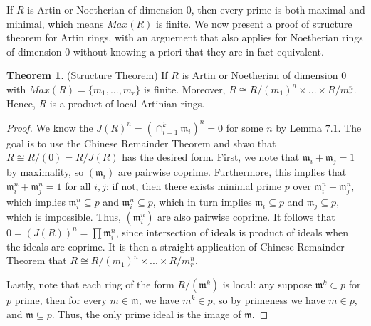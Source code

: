 \documentclass{article}
\theoremstyle{definition}
\newtheorem{theorem}{Theorem}[section]
\theoremstyle{definition}
\theoremstyle{definition}
\theoremstyle{definition}
\theoremstyle{definition}
\theoremstyle{definition}
\theoremstyle{definition}
\begin{document}
If $R$ is Artin or Noetherian of dimension $0$, then every prime is both maximal and minimal, which means $Max(R)$ is finite. We now present a proof of structure theorem for Artin rings, with an arguement that also applies for Noetherian rings of dimension $0$ without knowing a priori that they are in fact equivalent. 
\begin{tcolorbox}[colback=red!5!white,colframe=red!30!white]
\begin{theorem}
    (Structure Theorem) If $R$ is Artin or Noetherian of dimension $0$ with $Max(R)=\{m_1,...,m_r\}$ is finite. Moreover, $R\cong R/(m_1)^n\times...\times R/m_r^n$. Hence, $R$ is a product of local Artinian rings. 
\end{theorem}
\end{tcolorbox}
\begin{proof}
    We know the $J(R)^n=(\cap_{i=1}^k \mathfrak{m}_i)^n=0$ for some $n$ by Lemma $7.1$. The goal is to use the Chinese Remainder Theorem and shwo that $R\cong R/(0)=R/J(R)$ has the desired form. First, we note that $\mathfrak{m}_i+\mathfrak{m}_j=1$ by maximality, so $(\mathfrak{m}_i)$ are pairwise coprime. Furthermore, this implies that $\mathfrak{m}_i^n+\mathfrak{m}^n_j=1$ for all $i,j$: if not, then there exists minimal prime $p$ over $\mathfrak{m}_i^n+\mathfrak{m}_j^n$, which implies $\mathfrak{m}_i^n\subseteq p$ and $\mathfrak{m}_i^n\subseteq p$, which in turn implies $\mathfrak{m}_i\subseteq p$ and $\mathfrak{m}_j\subseteq p$, which is impossible. Thus, $(\mathfrak{m}_i^n)$ are also pairwise coprime. It follows that $0=(J(R))^n=\prod \mathfrak{m}_i^n$, since intersection of ideals is product of ideals when the ideals are coprime. It is then a straight application of Chinese Remainder Theorem that $R\cong R/(m_1)^n\times...\times R/m_r^n$. 
    
    Lastly, note that each ring of the form $R/(\mathfrak{m}^k)$ is local: any suppose $\mathfrak{m}^k\subset p$ for $p$ prime, then for every $m\in \mathfrak{m}$, we have $m^k\in p$, so by primeness we have $m\in p$, and $\mathfrak{m}\subseteq p$. Thus, the only prime ideal is the image of $\mathfrak{m}$.
\end{proof}
\end{document}

